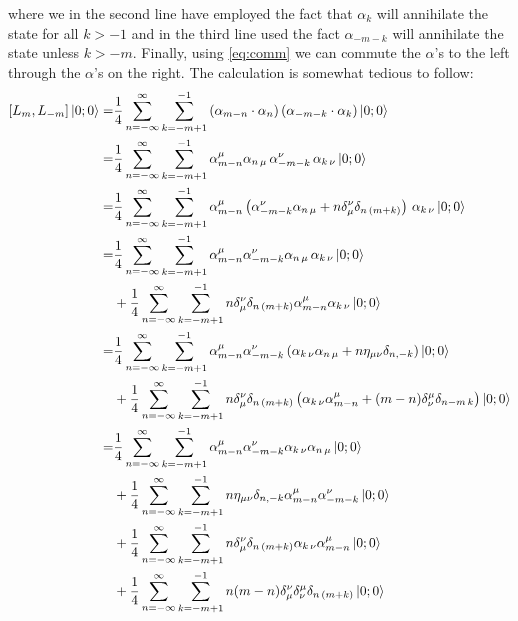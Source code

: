 \documentclass[a4paper,10pt]{article}
\renewcommand\[{\begin{equation*}}
\renewcommand\]{\end{equation*}}
\numberwithin{equation}{section}
\begin{document}
where we in the second line have employed the fact that $\alpha_k$ will annihilate the state for all $k>-1$ and in the third line used the fact $\alpha_{-m-k}$ will annihilate the state unless $k>-m$. Finally, using \eqref{eq:comm} we can commute the $\alpha$'s to the left through the $\alpha$'s on the right. The calculation is somewhat tedious to follow:
\begin{equation} \label{eq:4}
    \begin{aligned}
       [L_{m}, L_{-m}]\ket{0;0}
       =&\frac{1}{4}\sum^{\infty}_{n=-\infty}\sum_{k=-m+1}^{-1}
       \left(
       \alpha_{m-n}\cdot \alpha_n
       \right)
       \left(
       \alpha_{-m-k}\cdot \alpha_k
       \right)
       \ket{0;0}\\
       =&\frac{1}{4}\sum^{\infty}_{n=-\infty}\sum_{k=-m+1}^{-1}
       \alpha_{m-n}^\mu \alpha_{n\,\mu}\, 
       \alpha_{-m-k}^\nu\, \alpha_{k\,\nu}
       \ket{0;0}
       \\
       =&\frac{1}{4}\sum^{\infty}_{n=-\infty}\sum_{k=-m+1}^{-1}
       \alpha_{m-n}^\mu \left(
       \alpha_{-m-k}^\nu\alpha_{n\,\mu}+n\delta^{\nu}_{\mu}\delta_{n\,(m+k)} \right)\, \alpha_{k\,\nu}
       \ket{0;0}
        \\
       =&\frac{1}{4}\sum^{\infty}_{n=-\infty}\sum_{k=-m+1}^{-1}
       \alpha_{m-n}^\mu 
       \alpha_{-m-k}^\nu\alpha_{n\,\mu} \, \alpha_{k\,\nu}\ket{0;0}
       \\
       &+\frac{1}{4}\sum^{\infty}_{n=-\infty}\sum_{k=-m+1}^{-1} n\delta^{\nu}_{\mu}\delta_{n\,(m+k)}
       \alpha_{m-n}^\mu 
        \alpha_{k\,\nu}
       \ket{0;0}
        \\
       =&\frac{1}{4}\sum^{\infty}_{n=-\infty}\sum_{k=-m+1}^{-1}
       \alpha_{m-n}^\mu 
       \alpha_{-m-k}^\nu\left( \alpha_{k\,\nu}\alpha_{n\,\mu}+n\eta_{\mu\nu}\delta_{n,-k}\right)\ket{0;0}
       \\
       &+\frac{1}{4}\sum^{\infty}_{n=-\infty}\sum_{k=-m+1}^{-1} n\delta^{\nu}_{\mu}\delta_{n\,(m+k)}
     \left(
        \alpha_{k\,\nu} \alpha_{m-n}^\mu 
        +(m-n)\delta^{\mu}_{\nu}\delta_{n-m\,k}
     \right)
       \ket{0;0}
        \\
       =&\frac{1}{4}\sum^{\infty}_{n=-\infty}\sum_{k=-m+1}^{-1}
       \alpha_{m-n}^\mu 
       \alpha_{-m-k}^\nu \alpha_{k\,\nu}\alpha_{n\,\mu}\ket{0;0}
       \\
       &+\frac{1}{4}\sum^{\infty}_{n=-\infty}\sum_{k=-m+1}^{-1}
       n\eta_{\mu\nu}\delta_{n,-k} \alpha_{m-n}^\mu 
       \alpha_{-m-k}^\nu \ket{0;0}\\
       &+\frac{1}{4}\sum^{\infty}_{n=-\infty}\sum_{k=-m+1}^{-1} n\delta^{\nu}_{\mu}\delta_{n\,(m+k)}
        \alpha_{k\,\nu} \alpha_{m-n}^\mu 
       \ket{0;0}
       \\
       &+\frac{1}{4}\sum^{\infty}_{n=-\infty}\sum_{k=-m+1}^{-1} n(m-n)\delta^{\nu}_{\mu} \delta^{\mu}_{\nu}\delta_{n\,(m+k)}
       \ket{0;0}
    \end{aligned}
\end{equation}
\end{document}
